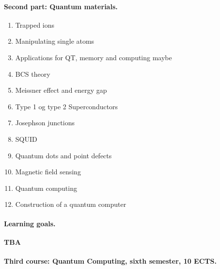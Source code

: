 \documentclass[%
oneside,                 %
final,                   %
10pt]{article}
\begin{document}
\paragraph{Second part: Quantum materials.}
\begin{enumerate}
\item Trapped ions 

\item Manipulating single atoms 

\item Applications for QT, memory and computing maybe

\item BCS theory

\item Meissner effect and energy gap 

\item Type 1 og type 2 Superconductors 

\item Josephson junctions 

\item SQUID 

\item Quantum dots and point defects

\item Magnetic field sensing 

\item Quantum computing

\item Construction of a quantum computer 
\end{enumerate}

\noindent




\paragraph{Learning goals.}
\textbf{TBA}



\paragraph{Third course: Quantum Computing, sixth semester, 10 ECTS.}

\end{document}
